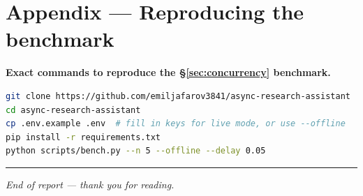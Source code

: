 \documentclass[11pt,a4paper]{article}
\begin{document}
\appendix
\section{Appendix --- Reproducing the benchmark}
\textbf{Exact commands to reproduce the \S\ref{sec:concurrency} benchmark.}

\begin{lstlisting}[style=python,language=bash,numbers=none]
git clone https://github.com/emiljafarov3841/async-research-assistant
cd async-research-assistant
cp .env.example .env  # fill in keys for live mode, or use --offline
pip install -r requirements.txt
python scripts/bench.py --n 5 --offline --delay 0.05
\end{lstlisting}

\vspace{1em}\hrule\vspace{0.6em}
\noindent\small\textit{End of report --- thank you for reading.}
\end{document}
